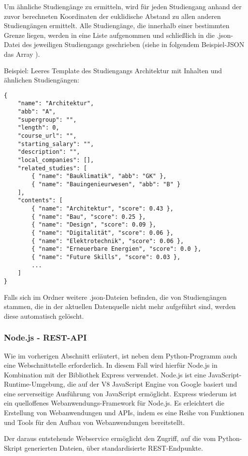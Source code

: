 Um ähnliche Studiengänge zu ermitteln, wird für jeden Studiengang anhand der zuvor berechneten Koordinaten der euklidische Abstand zu allen anderen Studiengängen ermittelt. Alle Studiengänge, die innerhalb einer bestimmten Grenze liegen, werden in eine Liste aufgenommen und schließlich in die .json-Datei des jeweiligen Studiengangs geschrieben (siehe in folgendem Beispiel-JSON das Array ).

\noindent
Beispiel: Leeres Template des Studiengangs Architektur mit Inhalten und ähnlichen Studiengängen:
\begin{lstlisting}[style=Python]
{
    "name": "Architektur",
    "abb": "A",
    "supergroup": "",
    "length": 0,
    "course_url": "",
    "starting_salary": "",
    "description": "",
    "local_companies": [],
    "related_studies": [
        { "name": "Bauklimatik", "abb": "GK" },
        { "name": "Bauingenieurwesen", "abb": "B" }
    ],
    "contents": [
        { "name": "Architektur", "score": 0.43 },
        { "name": "Bau", "score": 0.25 },
        { "name": "Design", "score": 0.09 },
        { "name": "Digitalität", "score": 0.06 },
        { "name": "Elektrotechnik", "score": 0.06 },
        { "name": "Erneuerbare Energien", "score": 0.0 },
        { "name": "Future Skills", "score": 0.03 },
        ...
    ]
}
\end{lstlisting}

Falls sich im Ordner weitere .json-Dateien befinden, die von Studiengängen stammen, die in der aktuellen Datenquelle nicht mehr aufgeführt sind, werden diese automatisch gelöscht.

\subsubsection{Node.js - REST-API}\label{sec:node-js-restapi}
Wie im vorherigen Abschnitt erläutert, ist neben dem Python-Programm auch eine Webschnittstelle erforderlich. In diesem Fall wird hierfür Node.js in Kombination mit der Bibliothek Express verwendet. Node.js ist eine JavaScript-Runtime-Umgebung, die auf der V8 JavaScript Engine von Google basiert und eine serverseitige Ausführung von JavaScript ermöglicht. \parencite{foundation_nodejs_2023} Express wiederum ist ein quelloffenes Webanwendungs-Framework für Node.js. Es erleichtert die Erstellung von Webanwendungen und APIs, indem es eine Reihe von Funktionen und Tools für den Aufbau von Webanwendungen bereitstellt.
\parencite{foundation_express_2023}

Der daraus entstehende Webservice ermöglicht den Zugriff, auf die vom Python-Skript generierten Dateien, über standardisierte REST-Endpunkte.

